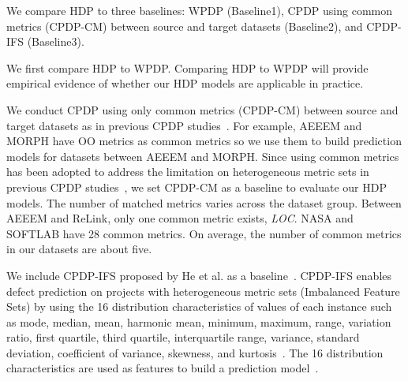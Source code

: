 We compare HDP to three baselines: WPDP (Baseline1), CPDP using common
metrics (CPDP-CM) between source and target datasets (Baseline2), and CPDP-IFS
(Baseline3).

We first compare HDP to WPDP. Comparing HDP
to WPDP will provide empirical evidence of whether our
HDP models are applicable in practice.


We conduct CPDP using only common metrics (CPDP-CM) between
source and target datasets as in previous CPDP
studies~\cite{He14,Ma12,Turhan09}.
For example, AEEEM and MORPH have OO metrics as common metrics so we use them to build prediction
models for datasets between AEEEM and MORPH. Since
using common metrics has been adopted to address the limitation on heterogeneous
metric sets in previous CPDP studies~\cite{He14,Ma12,Turhan09}, we set CPDP-CM
as a baseline to evaluate our HDP models.
The number of matched metrics varies across the dataset group. Between
AEEEM and ReLink, only one common metric exists, {\em LOC}.
NASA and SOFTLAB have 28 common metrics. On average, the number of common
metrics in our datasets are about five.

We include CPDP-IFS proposed by He et al. as a
baseline~\cite{He14}. CPDP-IFS enables defect prediction on
projects with heterogeneous metric sets (Imbalanced Feature Sets) by using the
16 distribution characteristics of values of each instance such as mode, median,
mean, harmonic mean, minimum, maximum, range, variation ratio, first quartile,
third quartile, interquartile range, variance, standard
deviation, coefficient of variance, skewness, and kurtosis~\cite{He14}.
The 16 distribution characteristics are used as features to build a prediction model~\cite{He14}.



